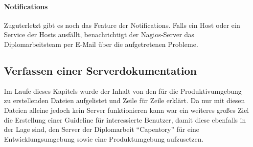 \hypertarget{notifications}{%
\paragraph{Notifications}\label{notifications}}

Zuguterletzt gibt es noch das Feature der Notifications. Falls ein Host
oder ein Service der Hosts ausfällt, benachrichtigt der Nagios-Server
das Diplomarbeitsteam per E-Mail über die aufgetretenen Probleme.

\hypertarget{verfassen-einer-serverdokumentation}{%
\subsection{Verfassen einer
Serverdokumentation}\label{verfassen-einer-serverdokumentation}}

Im Laufe dieses Kapitels wurde der Inhalt von den für die
Produktivumgebung zu erstellenden Dateien aufgelistet und Zeile für
Zeile erklärt. Da nur mit diesen Dateien alleine jedoch kein Server
funktionieren kann war ein weiteres großes Ziel die Erstellung einer
Guideline für interessierte Benutzer, damit diese ebenfalls in der Lage
sind, den Server der Diplomarbeit ``Capentory'' für eine
Entwicklungsumgebung sowie eine Produktumgebung aufzusetzen.
